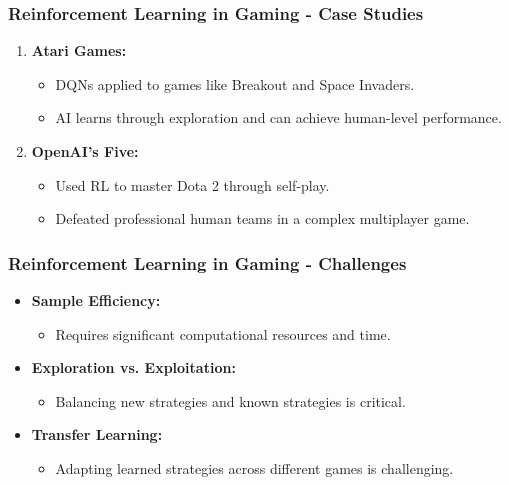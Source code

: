 \documentclass[aspectratio=169]{beamer}
\begin{document}
\begin{frame}[fragile]
    \frametitle{Reinforcement Learning in Gaming - Case Studies}
    \begin{enumerate}
        \item \textbf{Atari Games:}
            \begin{itemize}
                \item DQNs applied to games like Breakout and Space Invaders.
                \item AI learns through exploration and can achieve human-level performance.
            \end{itemize}
        \item \textbf{OpenAI's Five:}
            \begin{itemize}
                \item Used RL to master Dota 2 through self-play.
                \item Defeated professional human teams in a complex multiplayer game.
            \end{itemize}
    \end{enumerate}
\end{frame}

\begin{frame}[fragile]
    \frametitle{Reinforcement Learning in Gaming - Challenges}
    \begin{itemize}
        \item \textbf{Sample Efficiency:} 
            \begin{itemize}
                \item Requires significant computational resources and time.
            \end{itemize}
        \item \textbf{Exploration vs. Exploitation:} 
            \begin{itemize}
                \item Balancing new strategies and known strategies is critical.
            \end{itemize}
        \item \textbf{Transfer Learning:} 
            \begin{itemize}
                \item Adapting learned strategies across different games is challenging.
            \end{itemize}
    \end{itemize}
\end{frame}
\end{document}
